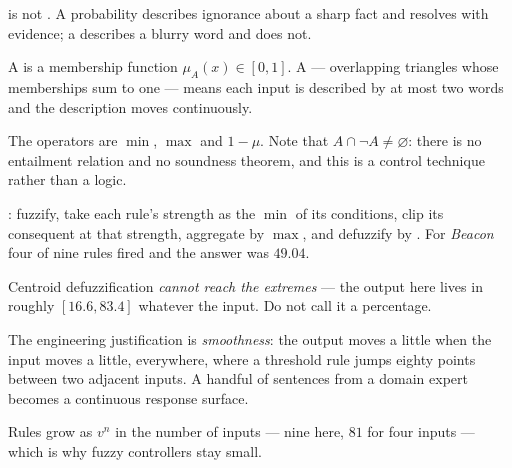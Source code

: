 \begin{chaptersummary}
\begin{tight}
  \item {} is not . A probability describes
        ignorance about a sharp fact and resolves with evidence; a  describes a blurry word and does not.
  \item A  is a membership function $\mu_{A}(x) \in [0,1]$. A
         --- overlapping triangles whose memberships sum to
        one --- means each input is described by at most two words and the
        description moves continuously.
  \item The operators are $\min$, $\max$ and $1-\mu$. Note that
        $A \cap \neg A \neq \varnothing$: there is no entailment relation and no
        soundness theorem, and this is a control technique rather than a logic.
  \item {}: fuzzify, take each rule's strength as the $\min$
        of its conditions, clip its consequent at that strength, aggregate by
        $\max$, and defuzzify by . For \emph{Beacon} four of nine
        rules fired and the answer was $49.04$.
  \item Centroid defuzzification \emph{cannot reach the extremes} --- the output
        here lives in roughly $[16.6, 83.4]$ whatever the input. Do not call it a
        percentage.
  \item The engineering justification is \emph{smoothness}: the output moves a
        little when the input moves a little, everywhere, where a threshold rule
        jumps eighty points between two adjacent inputs. A handful of sentences
        from a domain expert becomes a continuous response surface.
  \item Rules grow as $v^{n}$ in the number of inputs --- nine here, $81$ for four
        inputs --- which is why fuzzy controllers stay small.
\end{tight}
\end{chaptersummary}


